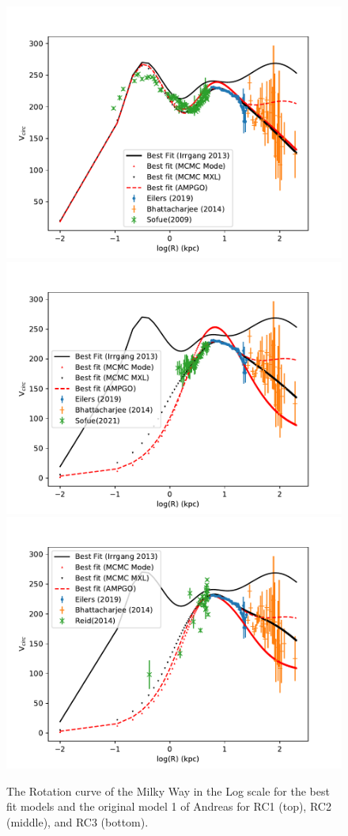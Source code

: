 \documentclass[fleqn,usenatbib]{mnras}
\begin{document}
\begin{figure}
\includegraphics[width=\columnwidth]{Model_III/Plots/Sofue(2009)/Rotcur_ModelIII_log_10000_100.pdf}
\includegraphics[width=\columnwidth]{Model_III/Plots/Sofue(2021)/Rotcur_ModelIII_log_10000_100.pdf}
\includegraphics[width=\columnwidth]{Model_III/Plots/Reid(2014)/Rotcur_ModelIII_log_10000_100.pdf}
\caption{The Rotation curve of the Milky Way in the Log scale for the best fit models and the original model 1 of Andreas for RC1 (top), RC2 (middle), and RC3 (bottom).
}
\label{fig:Model3_rc}
\end{figure}
\end{document}
